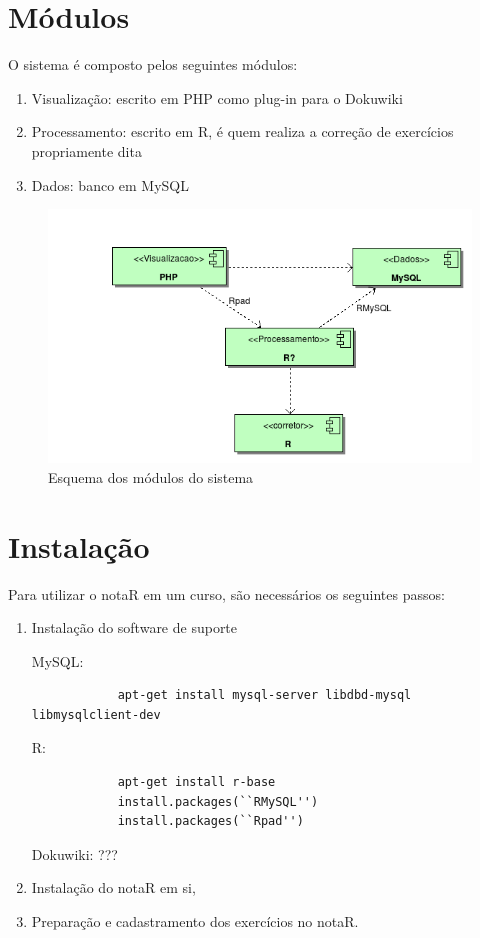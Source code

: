 \documentclass[12pt,a4paper]{article}
\begin{document}
\section{M\'odulos}
O sistema \'e composto pelos seguintes m\'odulos:
\begin{enumerate}
	\item Visualiza\c c\~ao: escrito em PHP como plug-in para o Dokuwiki
	\item Processamento: escrito em R, \'e quem realiza a corre\c c\~ao de
			exerc\'icios propriamente dita
	\item Dados: banco em MySQL
\end{enumerate}

\begin{figure}[htpb]
		\begin{center}
				\includegraphics[scale=0.50]{model/modulos.png}
		\end{center}
		\caption{Esquema dos m\'odulos do sistema}
		\label{fig:modulos}
\end{figure}
\section{Instala\c c\~ao}
Para utilizar o notaR em um curso, s\~ao necess\'arios os seguintes passos:
\begin{enumerate}
	\item Instala\c c\~ao do software de suporte

			MySQL:
			\begin{verbatim}
			apt-get install mysql-server libdbd-mysql libmysqlclient-dev
			\end{verbatim}
			R:
			\begin{verbatim}
			apt-get install r-base
			install.packages(``RMySQL'')
			install.packages(``Rpad'')
			\end{verbatim}
			Dokuwiki:
			???
	\item Instala\c c\~ao do notaR em si,
	\item Prepara\c c\~ao e cadastramento dos exerc\'icios no notaR.
\end{enumerate}
\end{document}
